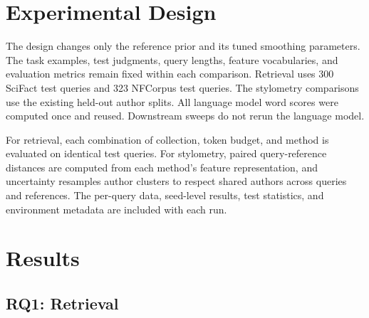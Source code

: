 \documentclass[11pt]{article}
\begin{document}
\section{Experimental Design}

The design changes only the reference prior and its tuned smoothing
parameters. The task examples, test judgments, query lengths, feature
vocabularies, and evaluation metrics remain fixed within each comparison.
Retrieval uses 300 SciFact test queries and 323 NFCorpus test queries. The
stylometry comparisons use the existing held-out author splits. All language
model word scores were computed once and reused. Downstream sweeps do not
rerun the language model.

For retrieval, each combination of collection, token budget, and method is
evaluated on identical test queries. For stylometry, paired query-reference
distances are computed from each method's feature representation, and
uncertainty resamples author clusters to respect shared authors across
queries and references. The per-query data, seed-level results, test
statistics, and environment metadata are included with each run.

\section{Results}

\subsection{RQ1: Retrieval}
\end{document}
